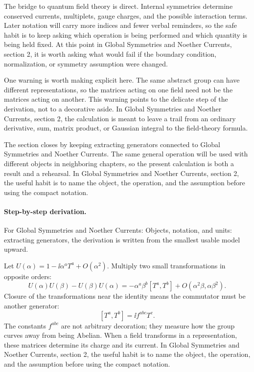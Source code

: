 The bridge to quantum field theory is direct.  Internal symmetries determine conserved currents, multiplets, gauge charges, and the possible interaction terms.  Later notation will carry more indices and fewer verbal reminders, so the safe habit is to keep asking which operation is being performed and which quantity is being held fixed.  At this point in Global Symmetries and Noether Currents, section 2, it is worth asking what would fail if the boundary condition, normalization, or symmetry assumption were changed.

One warning is worth making explicit here.  The same abstract group can have different representations, so the matrices acting on one field need not be the matrices acting on another.  This warning points to the delicate step of the derivation, not to a decorative aside.  In Global Symmetries and Noether Currents, section 2, the calculation is meant to leave a trail from an ordinary derivative, sum, matrix product, or Gaussian integral to the field-theory formula.

The section closes by keeping extracting generators connected to Global Symmetries and Noether Currents.  The same general operation will be used with different objects in neighboring chapters, so the present calculation is both a result and a rehearsal.  In Global Symmetries and Noether Currents, section 2, the useful habit is to name the object, the operation, and the assumption before using the compact notation.



\paragraph{Step-by-step derivation.}

For Global Symmetries and Noether Currents: Objects, notation, and units: extracting generators, the derivation is written from the smallest usable model upward.

Let \(U(\alpha)=1-\ii\alpha^aT^a+O(\alpha^2)\).  Multiply two small transformations in opposite orders:
\[
  U(\alpha)U(\beta)-U(\beta)U(\alpha)
  =
  -\alpha^a\beta^b[T^a,T^b]+O(\alpha^2\beta,\alpha\beta^2).
\]
Closure of the transformations near the identity means the commutator must be another generator:
\[
  [T^a,T^b]=\ii f^{abc}T^c.
\]
The constants \(f^{abc}\) are not arbitrary decoration; they measure how the group curves away from being Abelian.  When a field transforms in a representation, these matrices determine its charge and its current.  In Global Symmetries and Noether Currents, section 2, the useful habit is to name the object, the operation, and the assumption before using the compact notation.

